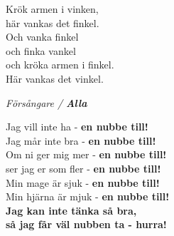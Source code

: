 \documentclass[a6paper,10pt]{article}
\begin{document}
\newpage
\setlength{\oddsidemargin}{-0.37in}
\noindent
\begin{center}
\end{center}
\begin{lyrics}
Krök armen i vinken, \\
här vankas det finkel. \\
Och vanka finkel \\
och finka vankel \\
och kröka armen i finkel. \\
Här vankas det vinkel. 
\end{lyrics}
\begin{center}
    \vspace{40pt}
    \textit{Försångare / \textbf{Alla}}
\end{center}
\begin{lyrics}
Jag vill inte ha - \textbf{en nubbe till!}\\
Jag mår inte bra - \textbf{en nubbe till!}\\
Om ni ger mig mer - \textbf{en nubbe till!}\\
ser jag er som fler - \textbf{en nubbe till!}\\
\vspace{5pt}
Min mage är sjuk - \textbf{en nubbe till!}\\
Min hjärna är mjuk - \textbf{en nubbe till!}\\
\textbf{Jag kan inte tänka så bra,\\
så jag får väl nubben ta - hurra!}\\
\end{lyrics}
\end{document}
